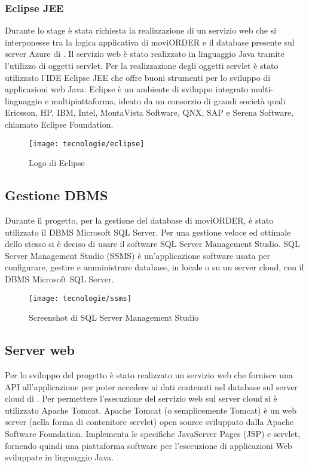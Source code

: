 \subsubsection{Eclipse JEE}

Durante lo stage è stata richiesta la realizzazione di un servizio web che si interponesse tra la logica applicativa di moviORDER e il database presente sul server Azure di \visione{}. Il servizio web è stato realizzato in linguaggio Java tramite l'utilizzo di oggetti servlet. Per la realizzazione degli oggetti servlet è stato utilizzato l'IDE Eclipse JEE che offre buoni strumenti per lo sviluppo di applicazioni web Java. Eclipse è un ambiente di sviluppo integrato multi-linguaggio e multipiattaforma, ideato da un consorzio di grandi società quali Ericsson, HP, IBM, Intel, MontaVista Software, QNX, SAP e Serena Software, chiamato Eclipse Foundation.

\begin{figure}[!h] 
    \centering 
    \texttt{[image: tecnologie/eclipse]} 
    \caption{Logo di Eclipse}
\end{figure}

\subsection{Gestione DBMS}

Durante il progetto, per la gestione del database di moviORDER, è stato utilizzato il DBMS Microsoft SQL Server. Per una gestione veloce ed ottimale dello stesso si è deciso di usare il software SQL Server Management Studio. SQL Server Management Studio (SSMS) è un'applicazione software usata per configurare, gestire e amministrare database, in locale o su un server cloud, con il DBMS Microsoft SQL Server. 

\begin{figure}[!h] 
    \centering 
    \texttt{[image: tecnologie/ssms]} 
    \caption{Screenshot di SQL Server Management Studio}
\end{figure}

\newpage

\subsection{Server web}

Per lo sviluppo del progetto è stato realizzato un servizio web che fornisce una API all'applicazione per poter accedere ai dati contenuti nel database sul server cloud di \visione{}. Per permettere l'esecuzione del servizio web sul server cloud si è utilizzato Apache Tomcat. Apache Tomcat (o semplicemente Tomcat) è un web server (nella forma di contenitore servlet) open source sviluppato dalla Apache Software Foundation. Implementa le specifiche JavaServer Pages (JSP) e servlet, fornendo quindi una piattaforma software per l'esecuzione di applicazioni Web sviluppate in linguaggio Java.

